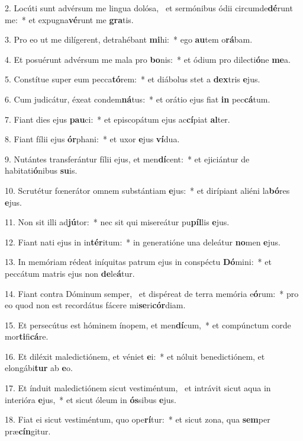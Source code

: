 2. Locúti sunt advérsum me lingua dolósa, \dag\  et sermónibus ódii circumde\textbf{dé}runt me:~*  et expugna\textbf{vé}runt me \textbf{gra}tis.\

3. Pro eo ut me dilígerent, detrahébant \textbf{mi}hi:~*  ego \textbf{au}tem o\textbf{rá}bam.\

4. Et posuérunt advérsum me mala pro \textbf{bo}nis:~*  et ódium pro dilecti\textbf{ó}ne \textbf{me}a.\

5. Constítue super eum pecca\textbf{tó}rem:~*  et diábolus stet a \textbf{dex}tris \textbf{e}jus.\

6. Cum judicátur, éxeat condem\textbf{ná}tus:~*  et orátio ejus fiat \textbf{in} pec\textbf{cá}tum.\

7. Fiant dies ejus \textbf{pau}ci:~*  et episcopátum ejus ac\textbf{cí}piat \textbf{al}ter.\

8. Fiant fílii ejus \textbf{ór}phani:~*  et uxor \textbf{e}jus \textbf{ví}dua.\

9. Nutántes transferántur fílii ejus, et men\textbf{dí}cent:~*  et ejiciántur de habitati\textbf{ó}nibus \textbf{su}is.\

10. Scrutétur fœnerátor omnem substántiam \textbf{e}jus:~*  et dirípiant aliéni la\textbf{bó}res \textbf{e}jus.\

11. Non sit illi ad\textbf{jú}tor:~*  nec sit qui misereátur pu\textbf{píl}lis \textbf{e}jus.\

12. Fiant nati ejus in in\textbf{tér}itum:~*  in generatióne una deleátur \textbf{no}men \textbf{e}jus.\

13. In memóriam rédeat iníquitas patrum ejus in conspéctu \textbf{Dó}mini:~*  et peccátum matris ejus non \textbf{de}le\textbf{á}tur.\

14. Fiant contra Dóminum semper, \dag\  et dispéreat de terra memória e\textbf{ó}rum:~*  pro eo quod non est recordátus fácere mi\textbf{se}ri\textbf{cór}diam.\

15. Et persecútus est hóminem ínopem, et men\textbf{dí}cum,~*  et compúnctum corde mor\textbf{ti}fi\textbf{cá}re.\

16. Et diléxit maledictiónem, et véniet \textbf{e}i:~*  et nóluit benedictiónem, et elongábi\textbf{tur} ab \textbf{e}o.\

17. Et índuit maledictiónem sicut vestiméntum, \dag\  et intrávit sicut aqua in interióra \textbf{e}jus,~*  et sicut óleum in \textbf{ós}sibus \textbf{e}jus.\

18. Fiat ei sicut vestiméntum, quo ope\textbf{rí}tur:~*  et sicut zona, qua \textbf{sem}per præ\textbf{cín}gitur.\

